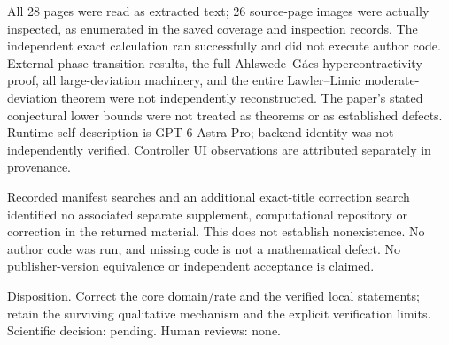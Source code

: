 \documentclass[10pt]{article}
\begin{document}
All 28 pages were read as extracted text; 26 source-page images were actually inspected, as enumerated in the saved coverage and inspection records. The independent exact calculation ran successfully and did not execute author code. External phase-transition results, the full Ahlswede–Gács hypercontractivity proof, all large-deviation machinery, and the entire Lawler–Limic moderate-deviation theorem were not independently reconstructed. The paper’s stated conjectural lower bounds were not treated as theorems or as established defects. Runtime self-description is GPT-6 Astra Pro; backend identity was not independently verified. Controller UI observations are attributed separately in provenance.\par
Recorded manifest searches and an additional exact-title correction search identified no associated separate supplement, computational repository or correction in the returned material. This does not establish nonexistence. No author code was run, and missing code is not a mathematical defect. No publisher-version equivalence or independent acceptance is claimed.\par
Disposition. Correct the core domain/rate and the verified local statements; retain the surviving qualitative mechanism and the explicit verification limits. Scientific decision: pending. Human reviews: none.\par
\end{document}
